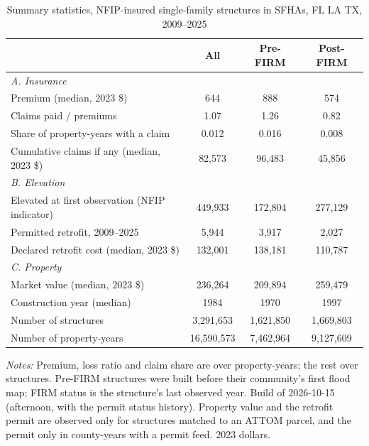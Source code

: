 \begin{table}[htbp]
\centering
\caption{Summary statistics, NFIP-insured single-family structures in SFHAs, FL LA TX, 2009--2025}
\label{tab:summary}
\begin{tabular}{lccc}
\hline
 & All & Pre-FIRM & Post-FIRM \\
\hline
\multicolumn{4}{l}{\textit{A. Insurance}} \\
\quad Premium (median, 2023 \$) & 644 & 888 & 574 \\
\quad Claims paid / premiums & 1.07 & 1.26 & 0.82 \\
\quad Share of property-years with a claim & 0.012 & 0.016 & 0.008 \\
\quad Cumulative claims if any (median, 2023 \$) & 82,573 & 96,483 & 45,856 \\
\multicolumn{4}{l}{\textit{B. Elevation}} \\
\quad Elevated at first observation (NFIP indicator) & 449,933 & 172,804 & 277,129 \\
\quad Permitted retrofit, 2009--2025 & 5,944 & 3,917 & 2,027 \\
\quad Declared retrofit cost (median, 2023 \$) & 132,001 & 138,181 & 110,787 \\
\multicolumn{4}{l}{\textit{C. Property}} \\
\quad Market value (median, 2023 \$) & 236,264 & 209,894 & 259,479 \\
\quad Construction year (median) & 1984 & 1970 & 1997 \\
\hline
Number of structures & 3,291,653 & 1,621,850 & 1,669,803 \\
Number of property-years & 16,590,573 & 7,462,964 & 9,127,609 \\
\hline
\end{tabular}
\begin{minipage}{0.95\linewidth}
\footnotesize \textit{Notes:} Premium, loss ratio and claim share are over property-years; the
rest over structures. Pre-FIRM structures were built before their community's first flood map;
FIRM status is the structure's last observed year. Build of 2026-10-15 (afternoon, with the permit status history).
Property value and the retrofit permit are observed only for structures matched to an ATTOM
parcel, and the permit only in county-years with a permit feed. 2023 dollars.
\end{minipage}
\end{table}
